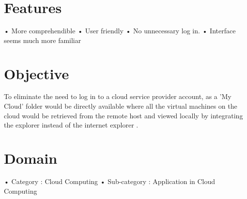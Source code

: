 \section{Features}

•  More comprehendible 
•	User friendly
•	No unnecessary log in.
•	Interface seems much more familiar

\section{Objective}

To eliminate the need to log in to a cloud service provider account, as a 'My Cloud' folder would be directly available where all the virtual machines on the cloud would be retrieved from the remote host and viewed locally by integrating the explorer instead of the internet explorer .
     
\section{Domain}

•  Category : Cloud Computing 
•	 Sub-category : Application in Cloud Computing
